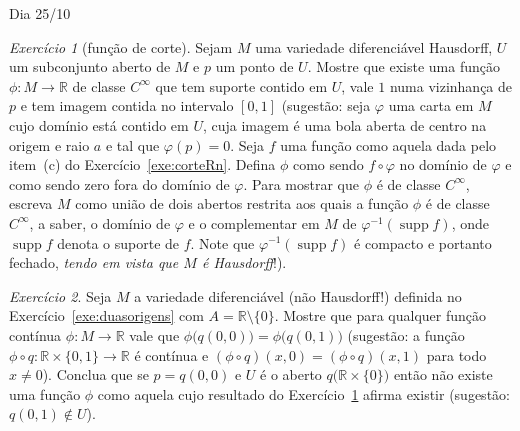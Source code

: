 \documentclass[oneside,11pt]{amsart}
\newcommand{\R}{\mathds R}
\DeclareMathOperator{\supp}{supp}
\theoremstyle{remark}\newtheorem{exercise}{Exercício}[section]
\theoremstyle{plain}\newtheorem{teo}{Teorema}[section]
\theoremstyle{plain}\newtheorem{lem}[teo]{Lema}
\theoremstyle{plain}\newtheorem{prop}[teo]{Proposição}
\theoremstyle{definition}\newtheorem{defin}[teo]{Definição}
\theoremstyle{remark}\newtheorem{rem}[teo]{Observação}
\theoremstyle{definition}\newtheorem{example}[teo]{Exemplo}
\numberwithin{equation}{section}
\begin{document}
\begin{section}{Dia 25/10}
\begin{exercise}[função de corte]\label{exe:cutoff}
Sejam $M$ uma variedade diferenciável Hausdorff, $U$ um subconjunto aberto de $M$ e $p$ um ponto de $U$. Mostre que existe uma função
$\phi:M\to\R$ de classe $C^\infty$ que tem suporte contido em $U$, vale $1$ numa vizinhança de $p$ e tem imagem contida no intervalo $[0,1]$ (sugestão:
seja $\varphi$ uma carta em $M$ cujo domínio está contido em $U$, cuja imagem é uma bola aberta de centro na origem e raio $a$ e tal que $\varphi(p)=0$.
Seja $f$ uma função como aquela dada pelo item~(c) do Exercício~\ref{exe:corteRn}. Defina $\phi$ como sendo $f\circ\varphi$ no domínio de $\varphi$
e como sendo zero fora do domínio de $\varphi$. Para mostrar que $\phi$ é de classe $C^\infty$, escreva $M$ como união de dois abertos restrita aos quais
a função $\phi$ é de classe $C^\infty$, a saber, o domínio de $\varphi$ e o complementar em $M$ de $\varphi^{-1}(\supp f)$, onde $\supp f$ denota o suporte
de $f$. Note que $\varphi^{-1}(\supp f)$ é compacto e portanto fechado, {\em tendo em vista que $M$ é Hausdorff\/}!).
\end{exercise}

\begin{exercise}
Seja $M$ a variedade diferenciável (não Hausdorff!) definida no Exercício~\ref{exe:duasorigens} com $A=\R\setminus\{0\}$. Mostre que para qualquer
função contínua $\phi:M\to\R$ vale que $\phi\big(q(0,0)\big)=\phi\big(q(0,1)\big)$ (sugestão: a função $\phi\circ q:\R\times\{0,1\}\to\R$ é contínua e
$(\phi\circ q)(x,0)=(\phi\circ q)(x,1)$ para todo $x\ne0$). Conclua que se $p=q(0,0)$ e $U$ é o aberto $q\big(\R\times\{0\}\big)$ então
não existe uma função $\phi$ como aquela cujo resultado do Exercício~\ref{exe:cutoff} afirma existir (sugestão: $q(0,1)\not\in U$).
\end{exercise}


\end{section}
\end{document}
